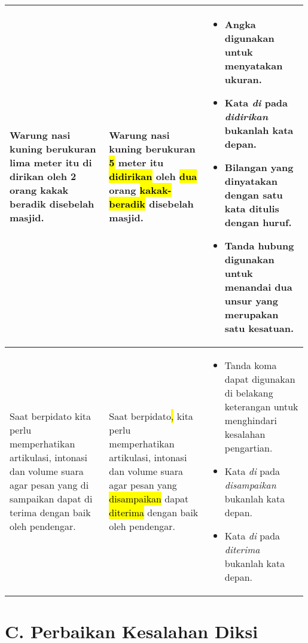 \documentclass[
	10pt, %
	indonesian
]{assignment}
\begin{document}
\begin{center}
\begin{longtable}{ p{0.33\linewidth} | p{0.33\linewidth} | p{0.33\linewidth}}
		\midrule

		Warung nasi kuning berukuran lima meter itu di dirikan oleh 2 orang kakak
		beradik disebelah masjid.
		     &
		Warung nasi kuning berukuran \hl{5} meter itu \hl{didirikan} oleh \hl{dua} orang \hl{kakak-beradik}
		disebelah masjid.
		     &
		\begin{itemize}
			\item Angka digunakan untuk menyatakan ukuran.
			\item Kata \textit{di} pada \textit{didirikan} bukanlah kata depan.
			\item Bilangan yang dinyatakan dengan satu kata ditulis dengan huruf.
			\item Tanda hubung digunakan untuk menandai dua unsur yang merupakan satu kesatuan.
		\end{itemize}                                   \\

		\midrule

		Saat berpidato kita perlu memperhatikan artikulasi, intonasi dan volume suara agar
		pesan yang di sampaikan dapat di terima dengan baik oleh pendengar.
		     &
		Saat berpidato\hl{,} kita perlu memperhatikan artikulasi, intonasi dan volume suara agar
		pesan yang \hl{disampaikan} dapat \hl{diterima} dengan baik oleh pendengar.
		     &
		\begin{itemize}
			\item Tanda koma dapat digunakan di belakang keterangan untuk menghindari kesalahan pengartian.
			\item Kata \textit{di} pada \textit{disampaikan} bukanlah kata depan.
			\item Kata \textit{di} pada \textit{diterima} bukanlah kata depan.
		\end{itemize}                       \\

		\bottomrule
	\end{longtable}
\end{center}

\pagebreak

\section*{C. Perbaikan Kesalahan Diksi}
\end{document}
